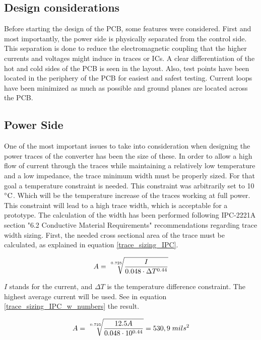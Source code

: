 \subsection{Design considerations} \label{PCB_Considerations}
Before starting the design of the PCB, some features were considered. First and most importantly, the power side is physically separated from the control side. This separation is done to reduce the electromagnetic coupling that the higher currents and voltages might induce in traces or ICs. A clear differentiation of the hot and cold sides of the PCB is seen in the layout.  Also, test points have been located in the periphery of the PCB for easiest and safest testing. Current loops have been minimized as much as possible and ground planes are located across the PCB.

\subsection{Power Side} \label{PCB_Power}
One of the most important issues to take into consideration when designing the power traces of the converter has been the size of these. In order to allow a high flow of current through the traces while maintaining a relatively low temperature and a low impedance, the trace minimum width must be properly sized. For that goal a temperature constraint is needed. This constraint was arbitrarily set to 10 $\decC$. Which will be the temperature increase of the traces working at full power. This constraint will lead to a high trace width, which is acceptable for a prototype.
The calculation of the width has been performed following IPC-2221A section "6.2 Conductive Material Requirements"  recommendations regarding trace width sizing. First, the needed cross sectional area of the trace must be calculated, as explained in equation \ref{trace_sizing_IPC}.

\begin{equation} \label{trace_sizing_IPC}
A = \sqrt[\leftroot{-2}\uproot{2}0.725]{\frac{I}{0.048\cdot \Delta T^{0.44}}}
\end{equation}

 $I$ stands for the current, and $\Delta T$ is the temperature difference constraint. The highest average current will be used. See in equation \ref{trace_sizing_IPC_w_numbers} the result.
 
 \begin{equation} \label{trace_sizing_IPC_w_numbers}
 A = \sqrt[\leftroot{-2}\uproot{2}0.725]{\frac{12.5 A}{0.048\cdot 10^{0.44}}} = 530,9 \; mils^2
 \end{equation}
 
